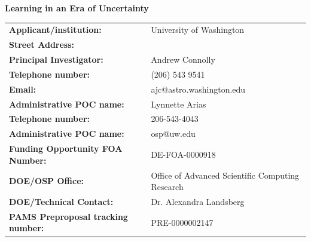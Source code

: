 \documentclass[prd,nofootbib,floatfix,11pt,tightenlines]{revtex4}
\begin{document}
 

\begin{center}
{\bf \Large Learning in an Era of Uncertainty}
\end{center}

\vspace{1cm}

\noindent
\begin{tabular}{ll}
{\bf Applicant/institution: } & University of Washington\\
{\bf Street Address: } & \\
{\bf Principal Investigator: } &Andrew Connolly \\
{\bf Telephone number: } & (206) 543 9541 \\
{\bf Email: } & ajc@astro.washington.edu \\
{\bf Administrative POC name:} & Lynnette Arias\\
{\bf Telephone number:} & 206-543-4043\\
{\bf Administrative POC name:} & osp@uw.edu\\
{\bf Funding Opportunity FOA Number:} & DE-FOA-0000918 \\
{\bf DOE/OSP Office: } & Office of Advanced Scientific Computing Research \\
{\bf DOE/Technical Contact: } & Dr. Alexandra Landsberg \\
{\bf PAMS Preproposal tracking number: } & PRE-0000002147 \\
\end{tabular}

\end{document}
